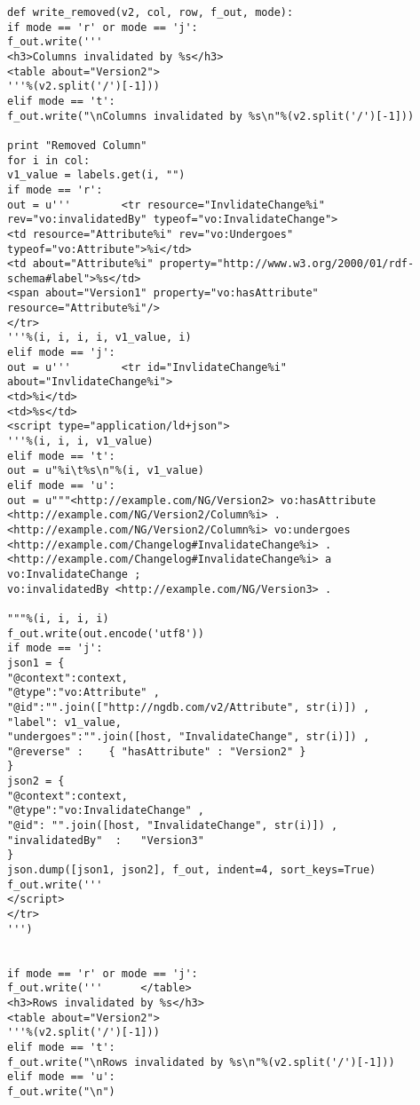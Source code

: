 \begin{verbatim}
def write_removed(v2, col, row, f_out, mode):
if mode == 'r' or mode == 'j':
f_out.write('''
<h3>Columns invalidated by %s</h3>
<table about="Version2">
'''%(v2.split('/')[-1]))
elif mode == 't':
f_out.write("\nColumns invalidated by %s\n"%(v2.split('/')[-1]))

print "Removed Column"
for i in col:
v1_value = labels.get(i, "")
if mode == 'r':
out = u'''        <tr resource="InvlidateChange%i" rev="vo:invalidatedBy" typeof="vo:InvalidateChange">
<td resource="Attribute%i" rev="vo:Undergoes" typeof="vo:Attribute">%i</td>
<td about="Attribute%i" property="http://www.w3.org/2000/01/rdf-schema#label">%s</td>
<span about="Version1" property="vo:hasAttribute" resource="Attribute%i"/>
</tr>
'''%(i, i, i, i, v1_value, i)
elif mode == 'j':
out = u'''        <tr id="InvlidateChange%i" about="InvlidateChange%i">
<td>%i</td>
<td>%s</td>
<script type="application/ld+json">
'''%(i, i, i, v1_value)
elif mode == 't':
out = u"%i\t%s\n"%(i, v1_value)
elif mode == 'u':
out = u"""<http://example.com/NG/Version2> vo:hasAttribute <http://example.com/NG/Version2/Column%i> .
<http://example.com/NG/Version2/Column%i> vo:undergoes <http://example.com/Changelog#InvalidateChange%i> .
<http://example.com/Changelog#InvalidateChange%i> a vo:InvalidateChange ;
vo:invalidatedBy <http://example.com/NG/Version3> .

"""%(i, i, i, i)
f_out.write(out.encode('utf8'))
if mode == 'j':
json1 = {
"@context":context,
"@type":"vo:Attribute" ,
"@id":"".join(["http://ngdb.com/v2/Attribute", str(i)]) ,
"label": v1_value,
"undergoes":"".join([host, "InvalidateChange", str(i)]) ,
"@reverse" :    { "hasAttribute" : "Version2" }
}
json2 = {
"@context":context,
"@type":"vo:InvalidateChange" ,
"@id": "".join([host, "InvalidateChange", str(i)]) ,
"invalidatedBy"  :   "Version3"
}
json.dump([json1, json2], f_out, indent=4, sort_keys=True)
f_out.write('''
</script>
</tr>
''')


if mode == 'r' or mode == 'j':
f_out.write('''      </table>
<h3>Rows invalidated by %s</h3>
<table about="Version2">
'''%(v2.split('/')[-1]))
elif mode == 't':
f_out.write("\nRows invalidated by %s\n"%(v2.split('/')[-1]))
elif mode == 'u':
f_out.write("\n")


\end{verbatim}

